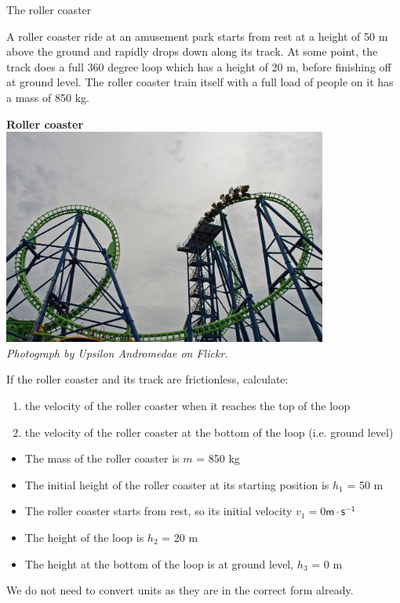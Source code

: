 \begin{wex}{The roller coaster}
{
\begin{minipage}{0.5\textwidth}
A roller coaster ride at an amusement park starts from rest at a height of 50 m above the ground and rapidly drops down along its track. At some point, the track does a full 360 degree loop which has a height of 20 m, before finishing off at ground level. The roller coaster train itself with a full load of people on it has a mass of 850 kg.  
\end{minipage}
\begin{minipage}{0.5\textwidth}
\begin{center}
\textbf{Roller coaster} \\
\includegraphics[width=0.8\textwidth]{photos/rollercoaster_by_Upsilon_Andromedae_Flickr.jpg}\\
\textit{Photograph by Upsilon Andromedae on Flickr.}
\end{center}
\end{minipage}
If the roller coaster and its track are frictionless, calculate:
\begin{enumerate}[label=\textbf{\arabic*}.]
\item the velocity of the roller coaster when it reaches the top of the loop
\item the velocity of the roller coaster at the bottom of the loop (i.e. ground level)
\end{enumerate}
}
{
\begin{itemize}
\item The mass of the roller coaster is $m$ = 850 kg
\item The initial height of the roller coaster at its starting position is $h_{1}$ = 50 m
\item The roller coaster starts from rest, so its initial velocity $v_{1} = 0 \mathsf{m\cdot s^{-1}}$
\item The height of the loop is $h_{2}$ = 20 m 
\item The height at the bottom of the loop is at ground level, $h_{3}$ = 0 m
\end{itemize}
We do not need to convert units as they are in the correct form already.

}
\end{wex}
